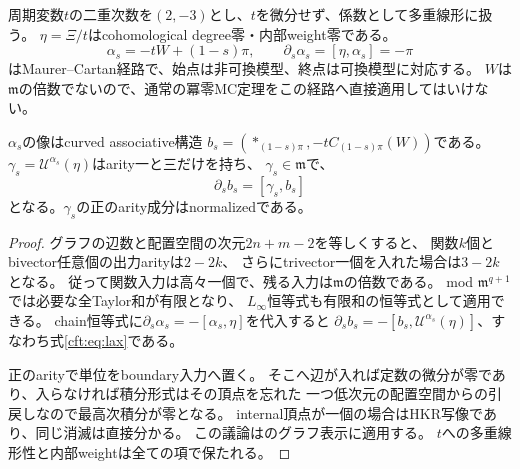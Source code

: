 周期変数$t$の二重次数を$(2,-3)$とし、$t$を微分せず、係数として多重線形に扱う。
$\eta=\Xi/t$はcohomological degree零・内部weight零である。
\begin{equation}\label{cft:eq:path}
 \alpha_s=-tW+(1-s)\pi,\qquad
 \partial_s\alpha_s=[\eta,\alpha_s]=-\pi
\end{equation}
はMaurer--Cartan経路で、始点は非可換模型、終点は可換模型に対応する。
$W$は$\mathfrak m$の倍数でないので、通常の冪零MC定理をこの経路へ直接適用してはいけない。

\begin{lemma}[大きい曲率でも有限なformality評価]\label{cft:lem:arity}
$\alpha_s$の像はcurved associative構造
$b_s=(*_{(1-s)\pi},-tC_{(1-s)\pi}(W))$である。
$\gamma_s=\mathcal U^{\alpha_s}(\eta)$はarity一と三だけを持ち、
$\gamma_s\in\mathfrak m$で、
\begin{equation}\label{cft:eq:lax}
 \partial_sb_s=[\gamma_s,b_s]
\end{equation}
となる。$\gamma_s$の正のarity成分はnormalizedである。
\end{lemma}
\begin{proof}
グラフの辺数と配置空間の次元$2n+m-2$を等しくすると、
関数$k$個とbivector任意個の出力arityは$2-2k$、
さらにtrivector一個を入れた場合は$3-2k$となる。
従って関数入力は高々一個で、残る入力は$\mathfrak m$の倍数である。
mod $\mathfrak m^{q+1}$では必要な全Taylor和が有限となり、
$L_\infty$恒等式も有限和の恒等式として適用できる。
chain恒等式に$\partial_s\alpha_s=-[\alpha_s,\eta]$を代入すると
$\partial_sb_s=-[b_s,\mathcal U^{\alpha_s}(\eta)]$、すなわち式\eqref{cft:eq:lax}である。

正のarityで単位をboundary入力へ置く。
そこへ辺が入れば定数の微分が零であり、入らなければ積分形式はその頂点を忘れた
一つ低次元の配置空間からの引戻しなので最高次積分が零となる。
internal頂点が一個の場合はHKR写像であり、同じ消滅は直接分かる。
この議論は\cite[Sections~6.2--6.4]{PKontsevich}のグラフ表示に適用する。
$t$への多重線形性と内部weightは全ての項で保たれる。
\end{proof}

